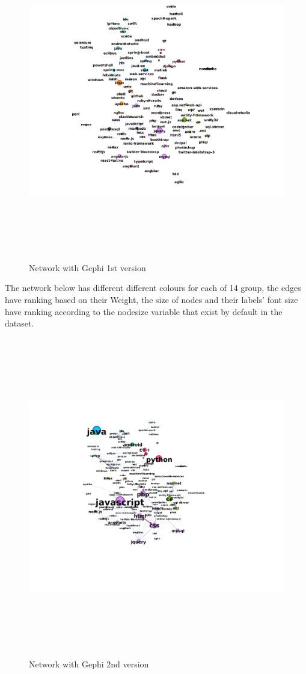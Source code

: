 \documentclass[12pt]{article}
\begin{document}
		\begin{figure}[ht]
			\includegraphics[width=17cm,height=14cm]{network}
			\caption{Network with Gephi 1st version}
		\end{figure}
		\FloatBarrier
		\clearpage 
		The network below has different different colours for each of 14 group, the edges have ranking based on their Weight, the size of nodes and their labels' font size have ranking according to the nodesize variable that exist by default in the dataset. 
		\begin{figure}[ht]
			\centering
			\includegraphics[width=20cm,height=14cm]{nodesize2}
			\caption{Network with Gephi 2nd version}
		\end{figure}
		\FloatBarrier
	
\end{document}
